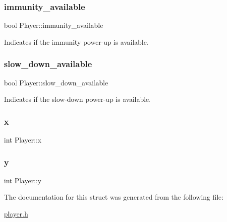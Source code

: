 \subsubsection{\texorpdfstring{immunity\+\_\+available}{immunity\_available}}
{\footnotesize\ttfamily bool Player\+::immunity\+\_\+available}



Indicates if the immunity power-\/up is available. 

\mbox{\label{structPlayer_a72cf5fd93edf473d84b70b1a77c27f1b}} 
\subsubsection{\texorpdfstring{slow\+\_\+down\+\_\+available}{slow\_down\_available}}
{\footnotesize\ttfamily bool Player\+::slow\+\_\+down\+\_\+available}



Indicates if the slow-\/down power-\/up is available. 

\mbox{\label{structPlayer_ad285b3cb25e4a46ca944b9a416c1b13f}} 
\subsubsection{\texorpdfstring{x}{x}}
{\footnotesize\ttfamily int Player\+::x}

\mbox{\label{structPlayer_a6da29d6e3783c6028c92647bbde478f5}} 
\subsubsection{\texorpdfstring{y}{y}}
{\footnotesize\ttfamily int Player\+::y}



The documentation for this struct was generated from the following file\+:\begin{DoxyCompactItemize}
\item 
\mbox{\hyperlink{player_8h}{player.\+h}}\end{DoxyCompactItemize}
